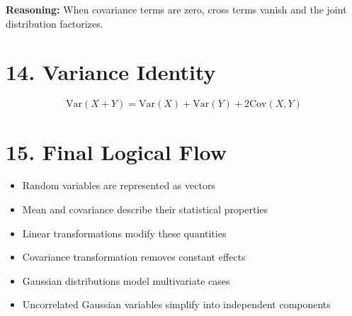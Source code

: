 \documentclass{article}
\begin{document}
\textbf{Reasoning:}  
When covariance terms are zero, cross terms vanish and the joint distribution factorizes.

\section*{14. Variance Identity}

\[
\text{Var}(X + Y) = \text{Var}(X) + \text{Var}(Y) + 2\text{Cov}(X,Y)
\]

\section*{15. Final Logical Flow}

\begin{itemize}
\item Random variables are represented as vectors
\item Mean and covariance describe their statistical properties
\item Linear transformations modify these quantities
\item Covariance transformation removes constant effects
\item Gaussian distributions model multivariate cases
\item Uncorrelated Gaussian variables simplify into independent components
\end{itemize}
\end{document}

